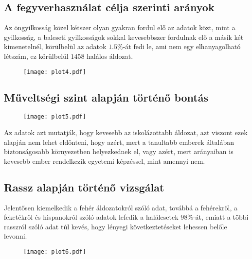 \documentclass{article}
\begin{document}
\subsection{A fegyverhasználat célja szerinti arányok}

\begin{minipage}{0.45\textwidth}
Az öngyilkosság közel kétszer olyan gyakran fordul elő az adatok közt, mint a gyilkosság, a baleseti gyilkosságok sokkal kevesebbszer fordulnak elő a másik két kimenetelnél, körülbelül az adatok $1.5\%$-át fedi le, ami nem egy elhanyagolható létszám, ez körülbelül $1458$ halálos áldozat.
\end{minipage}
\begin{minipage}{0.5\textwidth}
\begin{figure}[H]
\texttt{[image: plot4.pdf]}
\end{figure}
\end{minipage} \hfill

\subsection{Műveltségi szint alapján történő bontás}

\begin{minipage}{0.5\textwidth}
\begin{figure}[H]
\texttt{[image: plot5.pdf]}
\end{figure}
\end{minipage} \hfill
\begin{minipage}{0.45\textwidth}
Az adatok azt mutatják, hogy kevesebb az iskolázottabb áldozat, azt viszont ezek alapján nem lehet eldönteni, hogy azért, mert a tanultabb emberek általában biztonságosabb környezetben helyezkednek el, vagy azért, mert arányaiban is kevesebb ember rendelkezik egyetemi képzéssel, mint amennyi nem.
\end{minipage}

\subsection{Rassz alapján történő vizsgálat}

\begin{minipage}{0.45\textwidth}
Jelentősen kiemelkedik a fehér áldozatokról szóló adat, továbbá a fehérekről, a feketékről és hispanokról szóló adatok lefedik a halálesetek $98\%$-át, emiatt a többi rasszról szóló adat túl kevés, hogy lényegi következtetéseket lehessen belőle levonni.
\end{minipage}
\begin{minipage}{0.5\textwidth}
\begin{figure}[H]
\texttt{[image: plot6.pdf]}
\end{figure}
\end{minipage} \hfill
\end{document}
